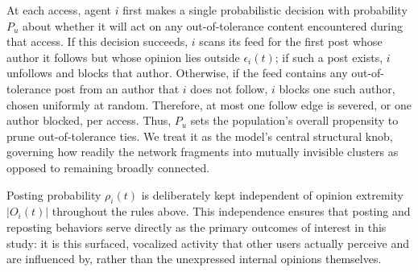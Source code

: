 \documentclass{svproc}
\def\post{\rho}                 %
\def\BoundedConfidence{\epsilon} %
\begin{document}
At each access, agent $i$ first makes a single probabilistic decision
with probability $P_u$ about whether it will act on any
out-of-tolerance content encountered during that access. If this
decision succeeds, $i$ scans its feed for the first post whose author
it follows but whose opinion lies outside $\BoundedConfidence_i(t)$;
if such a post exists, $i$ unfollows and blocks that
author. Otherwise, if the feed contains any out-of-tolerance post from
an author that $i$ does not follow, $i$ blocks one such author, chosen
uniformly at random. Therefore, at most one follow edge is severed, or
one author blocked, per access. Thus, $P_u$ sets the population's
overall propensity to prune out-of-tolerance ties. We treat it as the
model's central structural knob, governing how readily the network
fragments into mutually invisible clusters as opposed to remaining
broadly connected.
\par

Posting probability $\post_i(t)$ is deliberately kept independent of
opinion extremity $\vert O_i(t)\vert$ throughout the rules
above. This independence ensures that posting and reposting behaviors
serve directly as the primary outcomes of interest in this study: it
is this surfaced, vocalized activity that other users actually
perceive and are influenced by, rather than the unexpressed internal
opinions themselves.
\par
\end{document}
